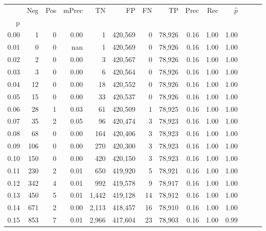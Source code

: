 \begin{tabular}{rrrrrrrrrrrrrr}
\toprule
{} &     Neg &    Pos & mPrec &       TN &       FP &      FN &      TP &  Prec &   Rec & $\hat{p}$ \\
p    &         &        &       &          &          &         &         &       &       &           \\
\midrule
0.00 &       1 &      0 &  0.00 &        1 &  420,569 &       0 &  78,926 &  0.16 &  1.00 &      1.00 \\
0.01 &       0 &      0 &   nan &        1 &  420,569 &       0 &  78,926 &  0.16 &  1.00 &      1.00 \\
0.02 &       2 &      0 &  0.00 &        3 &  420,567 &       0 &  78,926 &  0.16 &  1.00 &      1.00 \\
0.03 &       3 &      0 &  0.00 &        6 &  420,564 &       0 &  78,926 &  0.16 &  1.00 &      1.00 \\
0.04 &      12 &      0 &  0.00 &       18 &  420,552 &       0 &  78,926 &  0.16 &  1.00 &      1.00 \\
0.05 &      15 &      0 &  0.00 &       33 &  420,537 &       0 &  78,926 &  0.16 &  1.00 &      1.00 \\
0.06 &      28 &      1 &  0.03 &       61 &  420,509 &       1 &  78,925 &  0.16 &  1.00 &      1.00 \\
0.07 &      35 &      2 &  0.05 &       96 &  420,474 &       3 &  78,923 &  0.16 &  1.00 &      1.00 \\
0.08 &      68 &      0 &  0.00 &      164 &  420,406 &       3 &  78,923 &  0.16 &  1.00 &      1.00 \\
0.09 &     106 &      0 &  0.00 &      270 &  420,300 &       3 &  78,923 &  0.16 &  1.00 &      1.00 \\
0.10 &     150 &      0 &  0.00 &      420 &  420,150 &       3 &  78,923 &  0.16 &  1.00 &      1.00 \\
0.11 &     230 &      2 &  0.01 &      650 &  419,920 &       5 &  78,921 &  0.16 &  1.00 &      1.00 \\
0.12 &     342 &      4 &  0.01 &      992 &  419,578 &       9 &  78,917 &  0.16 &  1.00 &      1.00 \\
0.13 &     450 &      5 &  0.01 &    1,442 &  419,128 &      14 &  78,912 &  0.16 &  1.00 &      1.00 \\
0.14 &     671 &      2 &  0.00 &    2,113 &  418,457 &      16 &  78,910 &  0.16 &  1.00 &      1.00 \\
0.15 &     853 &      7 &  0.01 &    2,966 &  417,604 &      23 &  78,903 &  0.16 &  1.00 &      0.99 \\

\end{tabular}
